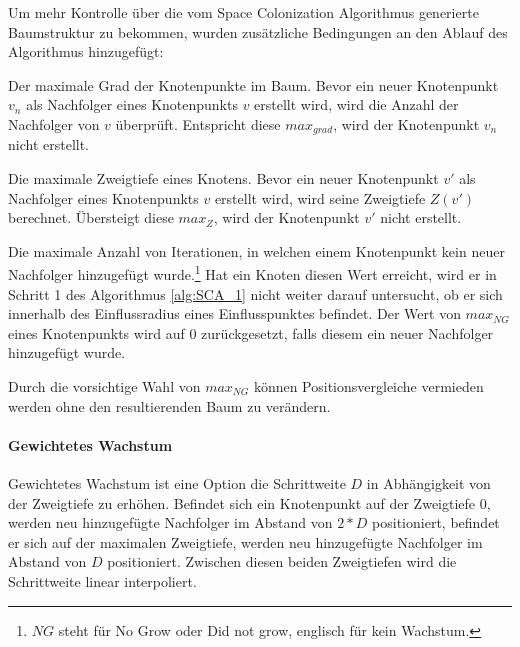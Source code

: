 Um mehr Kontrolle über die vom Space Colonization Algorithmus generierte Baumstruktur zu bekommen, wurden zusätzliche Bedingungen an den Ablauf des Algorithmus hinzugefügt:
\begin{description}[labelindent]
	\item[\boldmath$max_{grad}$] Der maximale Grad der Knotenpunkte im Baum. Bevor ein neuer Knotenpunkt $v_n$ als Nachfolger eines Knotenpunkts $v$ erstellt wird, wird die Anzahl der Nachfolger von $v$ überprüft. Entspricht diese $max_{grad}$, wird der Knotenpunkt $v_n$ nicht erstellt.\\
	
	\item[\boldmath$max_{Z}$] Die maximale Zweigtiefe eines Knotens. Bevor ein neuer Knotenpunkt $v'$ als Nachfolger eines Knotenpunkts $v$ erstellt wird, wird seine Zweigtiefe $Z(v')$ berechnet. Übersteigt diese $max_{Z}$, wird der Knotenpunkt $v'$ nicht erstellt.\\
	
	\item[\boldmath$max_{NG}$] Die maximale Anzahl von Iterationen, in welchen einem Knotenpunkt kein neuer Nachfolger hinzugefügt wurde.\footnote{$NG$ steht für \glqq No Grow\grqq{} oder \glqq Did not grow\grqq, englisch für \glqq kein Wachstum\grqq.} Hat ein Knoten diesen Wert erreicht, wird er in Schritt 1 des Algorithmus \ref{alg:SCA_1} nicht weiter darauf untersucht, ob er sich innerhalb des Einflussradius eines Einflusspunktes befindet. Der Wert von $max_{NG}$ eines Knotenpunkts wird auf $0$ zurückgesetzt, falls diesem ein neuer Nachfolger hinzugefügt wurde.
	
	Durch die vorsichtige Wahl von $max_{NG}$ können Positionsvergleiche vermieden werden ohne den resultierenden Baum zu verändern.
\end{description}

\paragraph{Gewichtetes Wachstum}

Gewichtetes Wachstum ist eine Option die Schrittweite $D$ in Abhängigkeit von der Zweigtiefe zu erhöhen. Befindet sich ein Knotenpunkt auf der Zweigtiefe $0$, werden neu hinzugefügte Nachfolger im Abstand von $2 * D$ positioniert, befindet er sich auf der maximalen Zweigtiefe, werden neu hinzugefügte Nachfolger im Abstand von $D$ positioniert. Zwischen diesen beiden Zweigtiefen wird die Schrittweite linear interpoliert.

